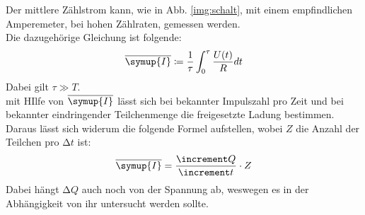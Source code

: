\noindent
Der mittlere Zählstrom kann, wie in Abb. \ref{img:schalt}, mit einem empfindlichen Amperemeter, bei hohen Zählraten, gemessen werden.\\
Die dazugehörige Gleichung ist folgende:
\begin{equation*}
    \overline{\symup{I}} \coloneq \frac{1}{\tau} \int_0^\tau \frac{U(t)}{R} dt
\end{equation*}
Dabei gilt $\tau \gg T$.\\
mit HIlfe von $ \overline{\symup{I}} $ lässt sich bei bekannter Impulszahl pro Zeit und bei bekannter eindringender Teilchenmenge die freigesetzte Ladung bestimmen.
Daraus lässt sich widerum die folgende Formel aufstellen, wobei $Z$ die Anzahl der Teilchen pro $\increment t$ ist:
\begin{equation*}
    \overline{\symup{I}} =\frac{\increment Q}{\increment t} \cdot Z
\end{equation*}
Dabei hängt $\increment Q$ auch noch von der Spannung ab, weswegen es in der Abhängigkeit von ihr untersucht werden sollte.
